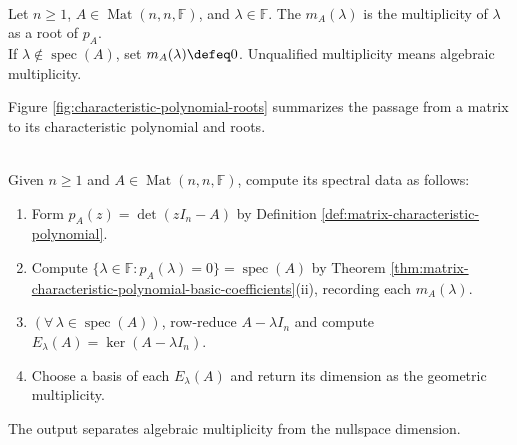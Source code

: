 \begin{definition} \label{def:matrix-algebraic-multiplicity} \\
Let $n\geq1$, $A\in\operatorname{Mat}(n,n,\mathbb{F})$, and $\lambda\in\mathbb{F}$. The  $m_A(\lambda)$ is the multiplicity of $\lambda$ as a root of $p_A$.\\
If $\lambda\notin\operatorname{spec}(A)$, set $m_A(\lambda)\defeq0$. Unqualified multiplicity means algebraic multiplicity.
\end{definition}

Figure \ref{fig:characteristic-polynomial-roots} summarizes the passage from a matrix to its characteristic polynomial and roots.

\begin{illustrationfigure}[H]
  \centering
  
  \caption{The chain $A\mapsto p_A\mapsto\{\lambda_1,\ldots,\lambda_d\}$; $m_A$ retains each root multiplicity.}
  \label{fig:characteristic-polynomial-roots}
\end{illustrationfigure}

\begin{computationmethod} \label{meth:characteristic-equation-eigenspace-computation} \\
Given $n\geq1$ and $A\in\operatorname{Mat}(n,n,\mathbb{F})$, compute its spectral data as follows:
\begin{enumerate}[label=(\roman*)]
\setlength{\itemsep}{0pt}
\item Form $p_A(z)=\det(zI_n-A)$ by Definition \ref{def:matrix-characteristic-polynomial}.
\item Compute $\{\lambda\in\mathbb{F}:p_A(\lambda)=0\}=\operatorname{spec}(A)$ by Theorem \ref{thm:matrix-characteristic-polynomial-basic-coefficients}(ii), recording each $m_A(\lambda)$.
\item $(\forall\,\lambda\in\operatorname{spec}(A))$, row-reduce $A-\lambda I_n$ and compute $E_{\lambda}(A)=\ker(A-\lambda I_n)$.
\item Choose a basis of each $E_{\lambda}(A)$ and return its dimension as the geometric multiplicity.
\end{enumerate}
The output separates algebraic multiplicity from the nullspace dimension.
\end{computationmethod}

